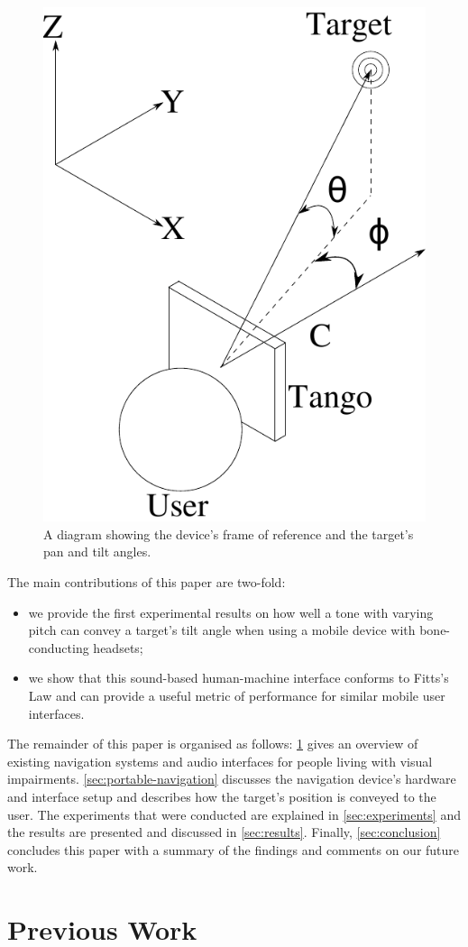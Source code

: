 \documentclass[sigconf, screen=true, anonymous=true]{acmart}
\begin{document}
\begin{figure}
  \centering
  \includegraphics[width=0.4\columnwidth]{figures/camera_coordinate.pdf}
  \caption{A diagram showing the device's frame of reference and the target's pan and tilt angles.}\label{fig:cam-coords}
\end{figure}

The main contributions of this paper are two-fold: 

\begin{itemize}
  \item we provide the first experimental results on how well a tone with varying pitch can convey a target's tilt angle when using a mobile device with bone-conducting headsets; 
  \item we show that this sound-based human-machine interface conforms to Fitts's Law and can provide a useful metric of performance for similar mobile user interfaces.
\end{itemize}

The remainder of this paper is organised as follows: \cref{sec:lit-review} gives an overview of existing navigation systems and audio interfaces for people living with visual impairments.
\cref{sec:portable-navigation} discusses the navigation device's hardware and interface setup and describes how the target's position is conveyed to the user.
The experiments that were conducted are explained in \cref{sec:experiments} and the results are presented and discussed in \cref{sec:results}. 
Finally, \cref{sec:conclusion} concludes this paper with a summary of the findings and comments on our future work. 

\section{Previous Work}\label{sec:lit-review}
\end{document}
